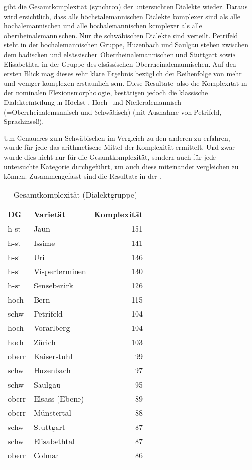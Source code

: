  gibt die Gesamtkomplexität (synchron) der untersuchten Dialekte wieder. Daraus wird ersichtlich, dass alle höchstalemannischen Dialekte komplexer sind als alle hochalemannischen und alle hochalemannischen komplexer als alle oberrheinalemannischen. Nur die schwäbischen Dialekte sind verteilt. Petrifeld steht in der hochalemannischen Gruppe, Huzenbach und Saulgau stehen zwischen dem badischen und elsässischen Oberrheinalemannischen und Stuttgart sowie Elisabethtal in der Gruppe des elsässischen Oberrheinalemannischen. Auf den ersten Blick mag dieses sehr klare Ergebnis bezüglich der Reihenfolge von mehr und weniger komplexen  erstaunlich sein. Diese Resultate, also die Komplexität in der nominalen Flexionsmorphologie, bestätigen jedoch die klassische Dialekteinteilung in Höchst-, Hoch- und Niederalemannisch (=Oberrheinalemannisch und Schwäbisch) (mit Ausnahme von Petrifeld, Sprachinsel!).



Um Genaueres zum Schwäbischen im Vergleich zu den anderen  zu erfahren, wurde für jede  das arithmetische Mittel der Komplexität ermittelt. Und zwar wurde dies nicht nur für die Gesamtkomplexität, sondern auch für jede untersuchte Kategorie durchgeführt, um auch diese miteinander vergleichen zu können. Zusammengefasst sind die Resultate in der .


\begin{table}[]
\caption{Gesamtkomplexität (Dialektgruppe)}\label{table6.17}
\begin{tabular}{llr}
\lsptoprule
{DG} & {Varietät} & {Komplexität}\\\midrule
h-st & Jaun & 151\\
h-st & Issime & 141\\
h-st & Uri & 136\\
h-st & Visperterminen & 130\\
h-st & Sensebezirk & 126\\
hoch & Bern & 115\\
schw & Petrifeld & 104\\
hoch & Vorarlberg & 104\\
hoch & Zürich & 103\\
oberr & Kaiserstuhl & 99\\
schw & Huzenbach & 97\\
schw & Saulgau & 95\\
oberr & Elsass (Ebene) & 89\\
oberr & Münstertal & 88\\
schw & Stuttgart & 87\\
schw & Elisabethtal & 87\\
oberr & Colmar & 86\\
\lspbottomrule
\end{tabular}
\end{table}


